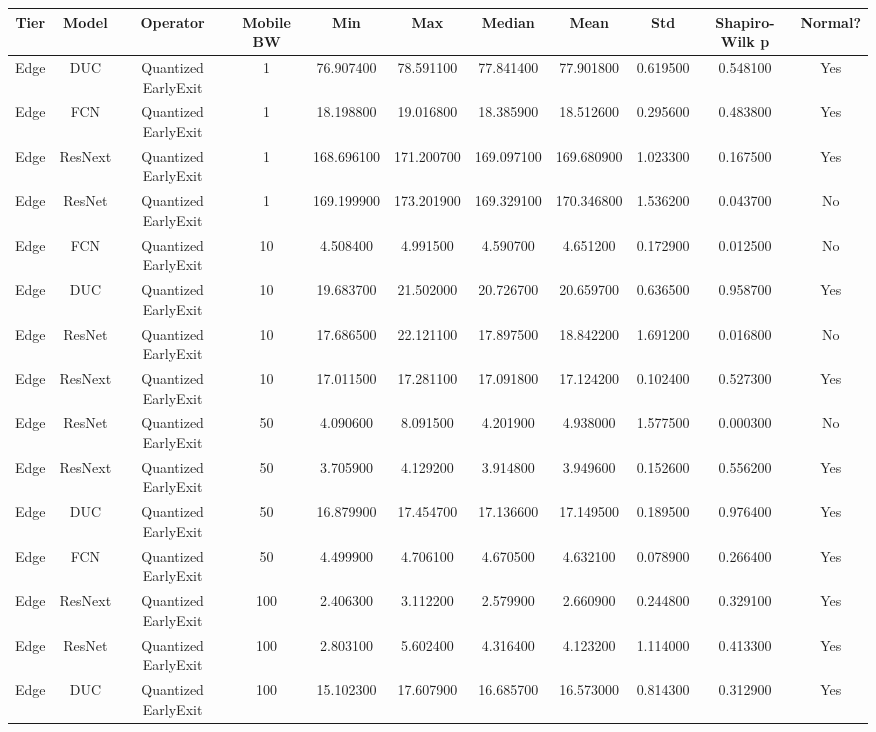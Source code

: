 \begin{tabular}{|c||c||c||c||c||c||c||c||c||c||c|}
\toprule
Tier & Model & Operator & Mobile BW & Min & Max & Median & Mean & Std & Shapiro-Wilk p & Normal? \\
\midrule
Edge & DUC & Quantized EarlyExit & 1 & 76.907400 & 78.591100 & 77.841400 & 77.901800 & 0.619500 & 0.548100 & Yes \\
Edge & FCN & Quantized EarlyExit & 1 & 18.198800 & 19.016800 & 18.385900 & 18.512600 & 0.295600 & 0.483800 & Yes \\
Edge & ResNext & Quantized EarlyExit & 1 & 168.696100 & 171.200700 & 169.097100 & 169.680900 & 1.023300 & 0.167500 & Yes \\
Edge & ResNet & Quantized EarlyExit & 1 & 169.199900 & 173.201900 & 169.329100 & 170.346800 & 1.536200 & 0.043700 & No \\
Edge & FCN & Quantized EarlyExit & 10 & 4.508400 & 4.991500 & 4.590700 & 4.651200 & 0.172900 & 0.012500 & No \\
Edge & DUC & Quantized EarlyExit & 10 & 19.683700 & 21.502000 & 20.726700 & 20.659700 & 0.636500 & 0.958700 & Yes \\
Edge & ResNet & Quantized EarlyExit & 10 & 17.686500 & 22.121100 & 17.897500 & 18.842200 & 1.691200 & 0.016800 & No \\
Edge & ResNext & Quantized EarlyExit & 10 & 17.011500 & 17.281100 & 17.091800 & 17.124200 & 0.102400 & 0.527300 & Yes \\
Edge & ResNet & Quantized EarlyExit & 50 & 4.090600 & 8.091500 & 4.201900 & 4.938000 & 1.577500 & 0.000300 & No \\
Edge & ResNext & Quantized EarlyExit & 50 & 3.705900 & 4.129200 & 3.914800 & 3.949600 & 0.152600 & 0.556200 & Yes \\
Edge & DUC & Quantized EarlyExit & 50 & 16.879900 & 17.454700 & 17.136600 & 17.149500 & 0.189500 & 0.976400 & Yes \\
Edge & FCN & Quantized EarlyExit & 50 & 4.499900 & 4.706100 & 4.670500 & 4.632100 & 0.078900 & 0.266400 & Yes \\
Edge & ResNext & Quantized EarlyExit & 100 & 2.406300 & 3.112200 & 2.579900 & 2.660900 & 0.244800 & 0.329100 & Yes \\
Edge & ResNet & Quantized EarlyExit & 100 & 2.803100 & 5.602400 & 4.316400 & 4.123200 & 1.114000 & 0.413300 & Yes \\
Edge & DUC & Quantized EarlyExit & 100 & 15.102300 & 17.607900 & 16.685700 & 16.573000 & 0.814300 & 0.312900 & Yes \\

\end{tabular}
